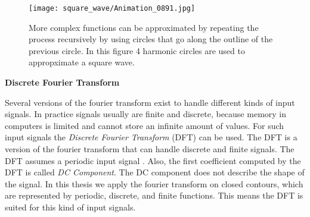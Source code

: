 \documentclass[thesis.tex]{subfiles}
\begin{document}
%
%

\begin{figure}[h]
\centering
\texttt{[image: square\_wave/Animation\_0891.jpg]}
\caption{More complex functions can be approximated by repeating the process recursively by using circles that go along the outline of the previous circle. In this figure 4 harmonic circles are used to appropximate a square wave.}
\label{fig:fourier_square}
\end{figure}

\textbf{Discrete Fourier Transform}

Several versions of the fourier transform exist to handle different kinds of input signals. In practice signals usually are finite and discrete, because memory in computers is limited and cannot store an infinite amount of values. For such input signals the \textit{Discrete Fourier Transform} (DFT) can be used. The DFT is a version of the fourier transform that can handle discrete and finite signals. The DFT assumes a periodic input signal \cite{dspguide}. Also, the first coefficient computed by the DFT is called \textit{DC Component}. The DC component does not describe the shape of the signal. In this thesis we apply the fourier transform on closed contours, which are represented by periodic, discrete, and finite functions. This means the DFT is suited for this kind of input signals.
\newpage
\end{document}
